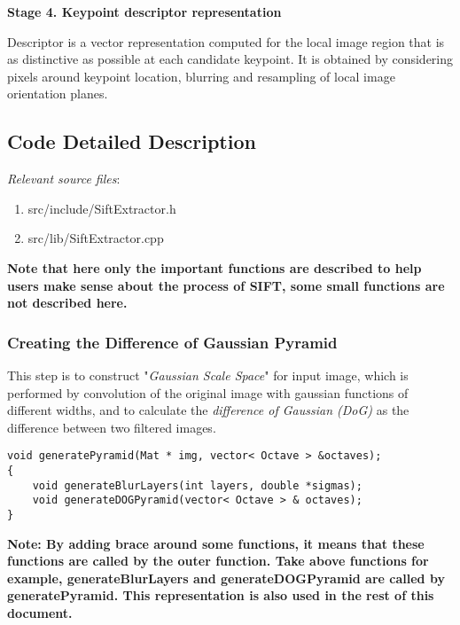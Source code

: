 \documentclass[paper=a4, fontsize=11pt]{scrartcl} %
\numberwithin{equation}{section} %
\numberwithin{figure}{section} %
\numberwithin{table}{section} %
\begin{document}
\textbf{Stage 4. Keypoint descriptor representation}

Descriptor is a vector representation computed for the local image region that is as distinctive as possible at each candidate keypoint. It is obtained by considering pixels around keypoint location, blurring and resampling of local image orientation planes. 

\subsection{Code Detailed Description}

\textsl{Relevant source files}: 

\begin{enumerate}
    \item src/include/SiftExtractor.h
    \item src/lib/SiftExtractor.cpp
\end{enumerate}

\textbf{Note that here only the important functions are described to help users make sense about the process of SIFT, some small functions are not described here.} 

\subsubsection{Creating the Difference of Gaussian Pyramid}

This step is to construct "\textsl{Gaussian Scale Space}" for input image, which is performed by convolution of the original image with gaussian functions of different widths, and to calculate the \textsl{difference of Gaussian (DoG)} as the difference between two filtered images.

\begin{lstlisting}
void generatePyramid(Mat * img, vector< Octave > &octaves);
{
    void generateBlurLayers(int layers, double *sigmas);
    void generateDOGPyramid(vector< Octave > & octaves);
}
\end{lstlisting}

\textbf{Note: By adding brace around some functions, it means that these functions are called by the outer function. Take above functions for example, generateBlurLayers and generateDOGPyramid are called by generatePyramid. This representation is also used in the rest of this document.} \\
\end{document}
